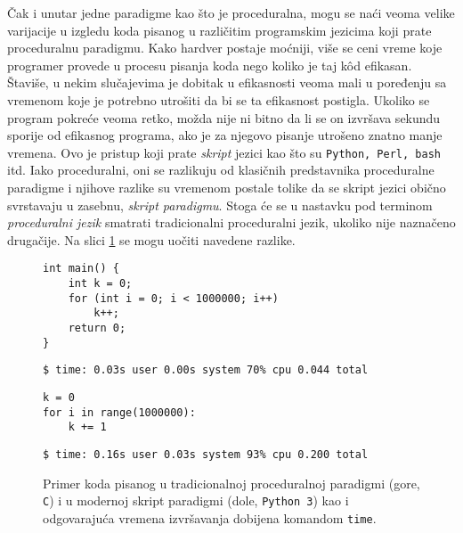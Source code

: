 Čak i unutar jedne paradigme kao što je proceduralna, mogu se naći veoma velike varijacije u izgledu koda pisanog u različitim programskim jezicima koji prate proceduralnu paradigmu. Kako hardver postaje moćniji, više se ceni vreme koje programer provede u procesu pisanja koda nego koliko je taj k\^od efikasan. Štaviše, u nekim slučajevima je dobitak u efikasnosti veoma mali u poređenju sa vremenom koje je potrebno utrošiti da bi se ta efikasnost postigla. Ukoliko se program pokreće veoma retko, možda nije ni bitno da li se on izvršava sekundu sporije od efikasnog programa, ako je za njegovo pisanje utrošeno znatno manje vremena. Ovo je pristup koji prate \emph{skript} jezici kao što su \texttt{Python, Perl, bash} itd. Iako proceduralni, oni se razlikuju od klasičnih predstavnika proceduralne paradigme i njihove razlike su vremenom postale tolike da se skript jezici obično svrstavaju u zasebnu, \emph{skript paradigmu}. Stoga će se u nastavku pod terminom \emph{proceduralni jezik} smatrati tradicionalni proceduralni jezik, ukoliko nije naznačeno drugačije. Na slici \ref{fig:LanguagesDiff} se mogu uočiti navedene razlike.

\begin{figure}[h!]
\begin{lstlisting}
int main() {
    int k = 0;
    for (int i = 0; i < 1000000; i++)
        k++;
    return 0;
}
\end{lstlisting}
\begin{lstlisting}[language={}]
$ time: 0.03s user 0.00s system 70% cpu 0.044 total
\end{lstlisting}
\begin{lstlisting}
k = 0
for i in range(1000000):
    k += 1
\end{lstlisting}
\begin{lstlisting}[language={}]
$ time: 0.16s user 0.03s system 93% cpu 0.200 total
\end{lstlisting}
\caption{Primer koda pisanog u tradicionalnoj proceduralnoj paradigmi (gore, \texttt{C}) i u modernoj skript paradigmi (dole, \texttt{Python 3}) kao i odgovarajuća vremena izvršavanja dobijena komandom \texttt{time}.}
\label{fig:LanguagesDiff}
\end{figure}

